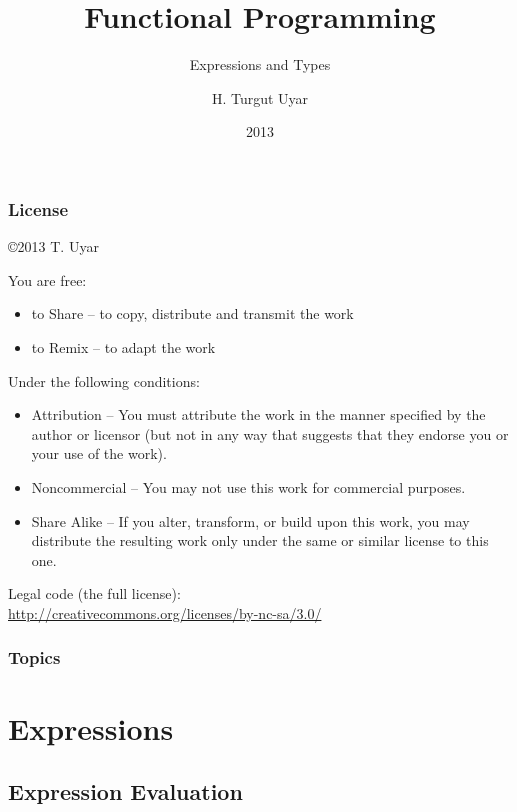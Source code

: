 \documentclass[dvipsnames]{beamer}
\title{Functional Programming}
\subtitle{Expressions and Types}
\author{H. Turgut Uyar}
\date{2013}
\theoremstyle{plain}
\begin{document}
\begin{frame}
  \titlepage
\end{frame}

\begin{frame}
  \frametitle{License}

  \hfill
  \copyright 2013 T. Uyar

  \vfill
  \begin{tiny}
    You are free:
    \begin{itemize}
      \item to Share -- to copy, distribute and transmit the work
      \item to Remix -- to adapt the work
    \end{itemize}

    Under the following conditions:
    \begin{itemize}
      \item Attribution -- You must attribute the work in the manner specified by
        the author or licensor (but not in any way that suggests that they
        endorse you or your use of the work).

      \item Noncommercial -- You may not use this work for commercial purposes.

      \item Share Alike -- If you alter, transform, or build upon this work, you
        may distribute the resulting work only under the same or similar license
        to this one.
    \end{itemize}
  \end{tiny}

  \vfill
  Legal code (the full license):\\
  \url{http://creativecommons.org/licenses/by-nc-sa/3.0/}
\end{frame}

\begin{frame}
  \frametitle{Topics}
  \tableofcontents
\end{frame}

\section{Expressions}

\subsection{Expression Evaluation}
\end{document}

